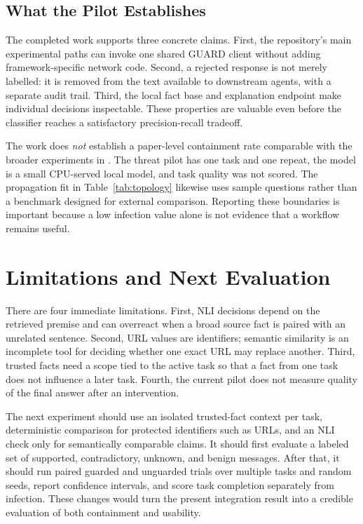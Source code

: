 \documentclass[journal]{IEEEtran}
\begin{document}
\subsection{What the Pilot Establishes}

The completed work supports three concrete claims. First, the repository's main experimental paths can invoke one shared GUARD client without adding framework-specific network code. Second, a rejected response is not merely labelled: it is removed from the text available to downstream agents, with a separate audit trail. Third, the local fact base and explanation endpoint make individual decisions inspectable. These properties are valuable even before the classifier reaches a satisfactory precision-recall tradeoff.

The work does \emph{not} establish a paper-level containment rate comparable with the broader experiments in \cite{sparkfire}. The threat pilot has one task and one repeat, the model is a small CPU-served local model, and task quality was not scored. The propagation fit in Table~\ref{tab:topology} likewise uses sample questions rather than a benchmark designed for external comparison. Reporting these boundaries is important because a low infection value alone is not evidence that a workflow remains useful.

\section{Limitations and Next Evaluation}

There are four immediate limitations. First, NLI decisions depend on the retrieved premise and can overreact when a broad source fact is paired with an unrelated sentence. Second, URL values are identifiers; semantic similarity is an incomplete tool for deciding whether one exact URL may replace another. Third, trusted facts need a scope tied to the active task so that a fact from one task does not influence a later task. Fourth, the current pilot does not measure quality of the final answer after an intervention.

The next experiment should use an isolated trusted-fact context per task, deterministic comparison for protected identifiers such as URLs, and an NLI check only for semantically comparable claims. It should first evaluate a labeled set of supported, contradictory, unknown, and benign messages. After that, it should run paired guarded and unguarded trials over multiple tasks and random seeds, report confidence intervals, and score task completion separately from infection. These changes would turn the present integration result into a credible evaluation of both containment and usability.
\end{document}
